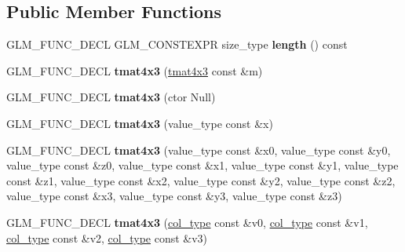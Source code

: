\subsection*{Public Member Functions}
\begin{DoxyCompactItemize}
\item 
\hypertarget{structglm_1_1detail_1_1tmat4x3_a9f220f61dddf244b80b067fcbae1be73}{}G\+L\+M\+\_\+\+F\+U\+N\+C\+\_\+\+D\+E\+C\+L G\+L\+M\+\_\+\+C\+O\+N\+S\+T\+E\+X\+P\+R size\+\_\+type {\bfseries length} () const \label{structglm_1_1detail_1_1tmat4x3_a9f220f61dddf244b80b067fcbae1be73}

\item 
\hypertarget{structglm_1_1detail_1_1tmat4x3_a2bc29b38393bf401dd8f0bba108e57b6}{}G\+L\+M\+\_\+\+F\+U\+N\+C\+\_\+\+D\+E\+C\+L {\bfseries tmat4x3} (\hyperlink{structglm_1_1detail_1_1tmat4x3}{tmat4x3} const \&m)\label{structglm_1_1detail_1_1tmat4x3_a2bc29b38393bf401dd8f0bba108e57b6}

\item 
\hypertarget{structglm_1_1detail_1_1tmat4x3_a6b5a22077997944d553a2e29bb8bd93f}{}G\+L\+M\+\_\+\+F\+U\+N\+C\+\_\+\+D\+E\+C\+L {\bfseries tmat4x3} (ctor Null)\label{structglm_1_1detail_1_1tmat4x3_a6b5a22077997944d553a2e29bb8bd93f}

\item 
\hypertarget{structglm_1_1detail_1_1tmat4x3_a84ebf60e36ccc8664fbd5d3657ec657b}{}G\+L\+M\+\_\+\+F\+U\+N\+C\+\_\+\+D\+E\+C\+L {\bfseries tmat4x3} (value\+\_\+type const \&x)\label{structglm_1_1detail_1_1tmat4x3_a84ebf60e36ccc8664fbd5d3657ec657b}

\item 
\hypertarget{structglm_1_1detail_1_1tmat4x3_a2d3dad3e9daec3807c32453770702127}{}G\+L\+M\+\_\+\+F\+U\+N\+C\+\_\+\+D\+E\+C\+L {\bfseries tmat4x3} (value\+\_\+type const \&x0, value\+\_\+type const \&y0, value\+\_\+type const \&z0, value\+\_\+type const \&x1, value\+\_\+type const \&y1, value\+\_\+type const \&z1, value\+\_\+type const \&x2, value\+\_\+type const \&y2, value\+\_\+type const \&z2, value\+\_\+type const \&x3, value\+\_\+type const \&y3, value\+\_\+type const \&z3)\label{structglm_1_1detail_1_1tmat4x3_a2d3dad3e9daec3807c32453770702127}

\item 
\hypertarget{structglm_1_1detail_1_1tmat4x3_a594cd3ad59e0166887b7db9c6e1e2cd6}{}G\+L\+M\+\_\+\+F\+U\+N\+C\+\_\+\+D\+E\+C\+L {\bfseries tmat4x3} (\hyperlink{structglm_1_1detail_1_1tvec3}{col\+\_\+type} const \&v0, \hyperlink{structglm_1_1detail_1_1tvec3}{col\+\_\+type} const \&v1, \hyperlink{structglm_1_1detail_1_1tvec3}{col\+\_\+type} const \&v2, \hyperlink{structglm_1_1detail_1_1tvec3}{col\+\_\+type} const \&v3)\label{structglm_1_1detail_1_1tmat4x3_a594cd3ad59e0166887b7db9c6e1e2cd6}


\end{DoxyCompactItemize}
